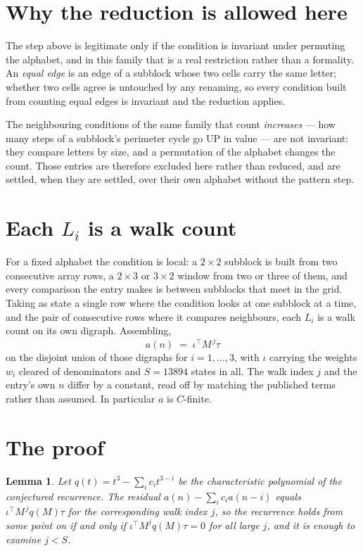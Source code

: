 \documentclass[11pt,a4paper]{article}
\theoremstyle{plain}
\newtheorem{lemma}[theorem]{Lemma}
\theoremstyle{definition}
\begin{document}
\section{Why the reduction is allowed here}

The step above is legitimate only if the condition is invariant under permuting the alphabet,
and in this family that is a real restriction rather than a formality. An \emph{equal edge}
is an edge of a subblock whose two cells carry the same letter; whether two cells agree is
untouched by any renaming, so every condition built from counting equal edges is invariant and
the reduction applies.

The neighbouring conditions of the same family that count \emph{increases} --- how many steps
of a subblock's perimeter cycle go UP in value --- are not invariant: they compare letters by
size, and a permutation of the alphabet changes the count. Those entries are therefore excluded
here rather than reduced, and are settled, when they are settled, over their own alphabet
without the pattern step.

\section{Each $L_i$ is a walk count}

For a fixed alphabet the condition is local: a $2\times2$ subblock is built from two
consecutive array rows, a $2\times3$ or $3\times2$ window from two or three of them, and every
comparison the entry makes is between subblocks that meet in the grid. Taking as state a single
row where the condition looks at one subblock at a time, and the pair of consecutive rows where
it compares neighbours, each $L_i$ is a walk count on its own digraph. Assembling,
\[
a(n)\;=\;\iota^{\!\top}M^{\,j}\tau
\]
on the disjoint union of those digraphs for $i=1,\dots,3$, with $\iota$ carrying the weights
$w_i$ cleared of denominators and $S=13894$ states in all. The walk index $j$ and the entry's own
$n$ differ by a constant, read off by matching the published terms rather than assumed. In
particular $a$ is $C$-finite.

\section{The proof}

\begin{lemma}\label{lem:crit}
Let $q(t)=t^{3}-\sum_i c_it^{3-i}$ be the characteristic polynomial of the
conjectured recurrence. The residual $a(n)-\sum_ic_ia(n-i)$ equals
$\iota^{\!\top}M^{\,j}q(M)\tau$ for the corresponding walk index $j$, so the recurrence
holds from some point on if and only if $\iota^{\!\top}M^{j}q(M)\tau=0$ for all large $j$,
and it is enough to examine $j<S$.
\end{lemma}
\end{document}

